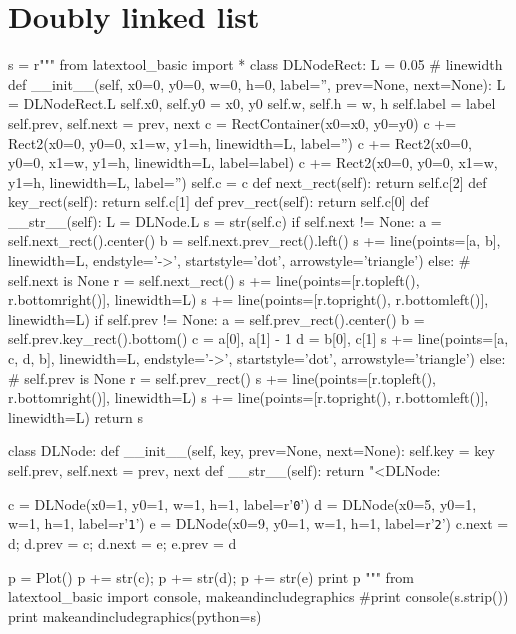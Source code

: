 \section{Doubly linked list}

\begin{python}
s = r"""
from latextool_basic import *
class DLNodeRect:
    L = 0.05 # linewidth
    def __init__(self, x0=0, y0=0, w=0, h=0, label='', 
                 prev=None, next=None):
        L = DLNodeRect.L
        self.x0, self.y0 = x0, y0
        self.w, self.h = w, h
        self.label = label
        self.prev, self.next = prev, next
        c = RectContainer(x0=x0, y0=y0)
        c += Rect2(x0=0, y0=0, x1=w, y1=h, linewidth=L, label='')
        c += Rect2(x0=0, y0=0, x1=w, y1=h, linewidth=L, label=label)
        c += Rect2(x0=0, y0=0, x1=w, y1=h, linewidth=L, label='')
        self.c = c
    def next_rect(self): return self.c[2]
    def key_rect(self): return self.c[1]
    def prev_rect(self): return self.c[0]
    def __str__(self):
        L = DLNode.L
        s = str(self.c)
        if self.next != None:
            a = self.next_rect().center()
            b = self.next.prev_rect().left()
            s += line(points=[a, b], linewidth=L, 
                      endstyle='->', startstyle='dot', arrowstyle='triangle')
        else: # self.next is None
            r = self.next_rect()
            s += line(points=[r.topleft(), r.bottomright()], linewidth=L)
            s += line(points=[r.topright(), r.bottomleft()], linewidth=L)
        if self.prev != None:
            a = self.prev_rect().center()
            b = self.prev.key_rect().bottom()
            c = a[0], a[1] - 1
            d = b[0], c[1]
            s += line(points=[a, c, d, b], linewidth=L, 
                      endstyle='->', startstyle='dot', arrowstyle='triangle')
        else: # self.prev is None
            r = self.prev_rect()
            s += line(points=[r.topleft(), r.bottomright()], linewidth=L)
            s += line(points=[r.topright(), r.bottomleft()], linewidth=L)
        return s
    
class DLNode:
    def __init__(self, key, prev=None, next=None):
        self.key = key
        self.prev, self.next = prev, next
    def __str__(self):
        return "<DLNode: %
        
c = DLNode(x0=1, y0=1, w=1, h=1, label=r'{\texttt 0}')
d = DLNode(x0=5, y0=1, w=1, h=1, label=r'{\texttt 1}')
e = DLNode(x0=9, y0=1, w=1, h=1, label=r'{\texttt 2}')
c.next = d; d.prev = c; d.next = e; e.prev = d

p = Plot()
p += str(c); p += str(d); p += str(e)
print p
"""
from latextool_basic import console, makeandincludegraphics
#print console(s.strip())
print makeandincludegraphics(python=s)
\end{python}

